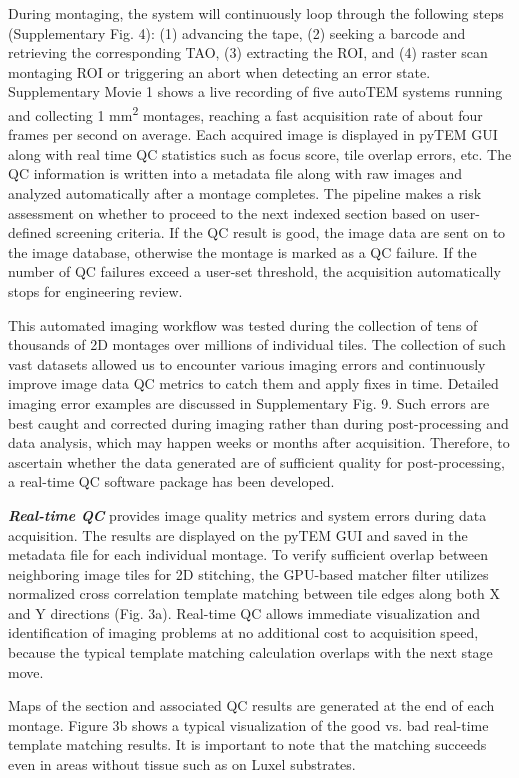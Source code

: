 \documentclass{article}
\begin{document}
During montaging, the system will continuously loop through the following steps (Supplementary Fig. 4): (1) advancing the tape, (2) seeking a barcode and retrieving the corresponding TAO, (3) extracting the ROI, and (4) raster scan montaging ROI or triggering an abort when detecting an error state. Supplementary Movie 1 shows a live recording of five autoTEM systems running and collecting 1 mm\textsuperscript{2} montages, reaching a fast acquisition rate of about four frames per second on average. Each acquired image is displayed in pyTEM GUI along with real time QC statistics such as focus score, tile overlap errors, etc. The QC information is written into a metadata file along with raw images and analyzed automatically after a montage completes. The pipeline makes a risk assessment on whether to proceed to the next indexed section based on user-defined screening criteria. If the QC result is good, the image data are sent on to the image database, otherwise the montage is marked as a QC failure. If the number of QC failures exceed a user-set threshold, the acquisition automatically stops for engineering review.

This automated imaging workflow was tested during the collection of tens of thousands of 2D montages over millions of individual tiles. The collection of such vast datasets allowed us to encounter various imaging errors and continuously improve image data QC metrics to catch them and apply fixes in time. Detailed imaging error examples are discussed in Supplementary Fig. 9. Such errors are best caught and corrected during imaging rather than during post-processing and data analysis, which may happen weeks or months after acquisition. Therefore, to ascertain whether the data generated are of sufficient quality for post-processing, a real-time QC software package has been developed.

\textbf{\emph{Real-time QC}} provides image quality metrics and system errors during data acquisition. The results are displayed on the pyTEM GUI and saved in the metadata file for each individual montage. To verify sufficient overlap between neighboring image tiles for 2D stitching, the GPU-based matcher filter utilizes normalized cross correlation template matching between tile edges along both X and Y directions (Fig. 3a). Real-time QC allows immediate visualization and identification of imaging problems at no additional cost to acquisition speed, because the typical template matching calculation overlaps with the next stage move.

Maps of the section and associated QC results are generated at the end of each montage. Figure 3b shows a typical visualization of the good vs. bad real-time template matching results. It is important to note that the matching succeeds even in areas without tissue such as on Luxel substrates.
\end{document}
